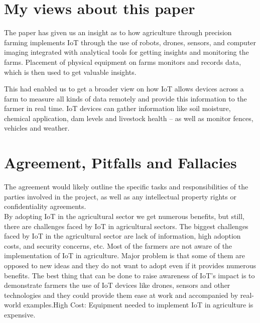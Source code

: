 \documentclass{report}
\begin{document}
\begin{multicols}{1}
    \section*{My views about this paper}
   The paper has given us an insight as to how agriculture through precision farming implements IoT through the use of robots, drones, sensors, and computer imaging integrated with analytical tools for getting insights and monitoring the farms. Placement of physical equipment on farms monitors and records data, which is then used to get valuable insights.
   
   This had enabled us to get a broader view on how IoT allows devices across a farm to measure all kinds of data remotely and provide this information to the farmer in real time. IoT devices can gather information like soil moisture, chemical application, dam levels and livestock health – as well as monitor fences, vehicles and weather.\\
    

    
    \section*{Agreement, Pitfalls and Fallacies}
    
    \begin{itemize}
     The agreement would likely outline the specific tasks and responsibilities of the parties involved in the project, as well as any intellectual property rights or confidentiality agreements.\\
     
     By adopting IoT in the agricultural sector we get numerous benefits, but still, there are challenges faced by IoT in agricultural sectors. The biggest challenges faced by IoT in the agricultural sector are lack of information, high adoption costs, and security concerns, etc. Most of the farmers are not aware of the implementation of IoT in agriculture. Major problem is that some of them are opposed to new ideas and they do not want to adopt even if it provides numerous benefits. The best thing that can be done to raise awareness of IoT’s impact is to demonstrate farmers the use of IoT devices like drones, sensors and other technologies and they could provide them ease at work and accompanied by real-world examples.High Cost: Equipment needed to implement IoT in agriculture is expensive. 
     

\end{itemize}
\end{multicols}
\end{document}
